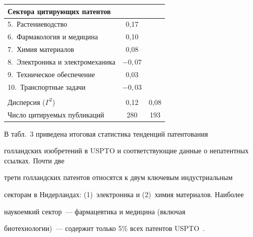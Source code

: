 \begin{table}
\begin{center}
\begin{tabular}{|l|c|c|}
\hline


\multicolumn{3}{|l|}{Сектора цитирующих патентов}\\


\hline


\hphantom{9}5.\ Растениеводство & 0,17 &\\


\hphantom{9}6.\ Фармакология и медицина & 0,10 &\\


\hphantom{9}7.\ Химия материалов & 0,08&\\


\hphantom{9}8.\ Электроника и электромеханика & $-0{,}07$\hphantom{$-$} &\\


\hphantom{9}9.\ Техническое обеспечение & 0,03 &\\


10.\  Транспортные задачи & $-0{,}03$\hphantom{$-$} &\\


\hline


&&\\[-9pt]


Дисперсия ($\Gamma^2$) & 0,12 & 0,08\\


\hline


Число цитируемых публикаций & 280& 193\\


\hline


\end{tabular}


      \end{center}


      \end{table} 


  


  В табл.~3 приведена итоговая статистика тенденций патентования 


голландских изобретений в USPTO и соответствующие данные о непатентных ссылках. Почти две 


трети голландских патентов относятся к двум ключевым индустриальным 


секторам в Нидерландах: (1)~электроника и (2)~химия материалов. Наиболее 


наукоемкий сектор~--- фармацевтика и медицина (включая 


биотехнологии)~--- содержит только 5\% всех патентов USPTO~\cite{1-koz}. 


